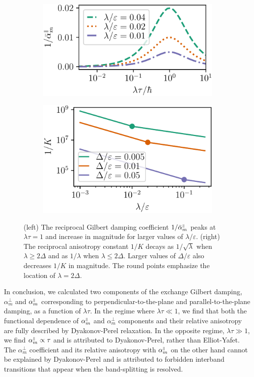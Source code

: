 \begin{figure}
\begin{subfigure}{.5\textwidth}
  \centering
  \includegraphics[width=.95\linewidth]{gfx/inverse_alpha.pdf}
\end{subfigure}%
\begin{subfigure}{.5\textwidth}
  \centering
  \includegraphics[width=.88\linewidth]{gfx/inverse_K.pdf}
\end{subfigure}
\caption{(left) The reciprocal Gilbert damping coefficient $1/\bar{\alpha}_m^{{\scriptscriptstyle\parallel}}$ peaks at $\lambda\tau=1$ and increase in magnitude for larger values of $\lambda/\varepsilon$. (right) The reciprocal anisotropy constant $1/K$ decays as $1/\sqrt{\lambda}$ when $\lambda\geq2\Delta$ and as $1/{\lambda}$ when $\lambda\leq2\Delta$. Larger values of $\Delta/\varepsilon$ also decreases $1/K$ in magnitude. The round points emphasize the location of $\lambda=2\Delta$.}
\label{fig:max}
\end{figure}

In conclusion, we calculated two components of the exchange Gilbert damping, $\alpha_m^\perp$ and $\alpha_m^{\scriptscriptstyle\parallel}$ corresponding to perpendicular-to-the-plane and parallel-to-the-plane damping, as a function of $\lambda\tau$. In the regime where $\lambda\tau\ll1$, we find that both the functional dependence of $\alpha_m^{\scriptscriptstyle\parallel}$ and $\alpha_m^\perp$ components and their relative anisotropy are fully described by Dyakonov-Perel relaxation. In the opposite regime, $\lambda\tau\gg1$, we find $\alpha_m^{\scriptscriptstyle\parallel}\propto \tau$ and is attributed to Dyakonov-Perel, rather than Elliot-Yafet. The $\alpha_m^\perp$ coefficient and its relative anisotropy with $\alpha_m^{\scriptscriptstyle\parallel}$  on the other hand cannot be explained by Dyakonov-Perel and is attributed to forbidden interband transitions that appear when the band-splitting is resolved. 

